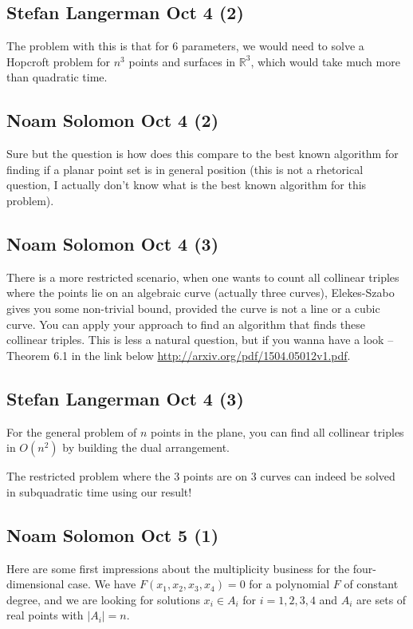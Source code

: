 \subsection{Stefan Langerman Oct 4 (2)}
The problem with this is that for $6$ parameters, we would need to solve
a Hopcroft problem for $n^3$ points and surfaces in $\mathbb{R}^3$, which would
take much more than quadratic time.

\subsection{Noam Solomon Oct 4 (2)}
Sure but the question is how does this compare to the best known algorithm
for finding if a planar point set is in general position (this is not a
rhetorical question, I actually don't know what is the best known algorithm
for this problem).

\subsection{Noam Solomon Oct 4 (3)}
There is a more restricted scenario, when one wants to count all collinear
triples where the points lie on an algebraic curve (actually three curves),
Elekes-Szabo gives you some non-trivial bound, provided the curve is not a
line or a cubic curve.
You can apply your approach to find an algorithm that finds these collinear
triples.
This is less a natural question, but if you wanna have a look -- Theorem 6.1
in the link below
\url{http://arxiv.org/pdf/1504.05012v1.pdf}.

\subsection{Stefan Langerman Oct 4 (3)}
For the general problem of $n$ points in the plane, you can find all
collinear triples in $O(n^2)$ by building the dual arrangement.

The restricted problem where the 3 points are on 3 curves can indeed
be solved in subquadratic time using our result!

\subsection{Noam Solomon Oct 5 (1)}
Here are some first impressions about the multiplicity business for the
four-dimensional case.
We have $F(x_1,x_2,x_3,x_4)=0$ for a polynomial $F$ of constant degree, and we
are looking for solutions $x_i \in A_i$ for $i=1,2,3,4$ and $A_i$ are sets of
real points with $|A_i|=n$.

